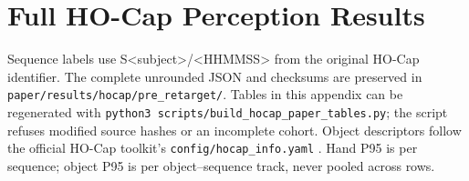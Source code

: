 \chapter{Full HO-Cap Perception Results}
\label{app:hocap}
Sequence labels use S<subject>/<HHMMSS> from the original HO-Cap identifier.
The complete unrounded JSON and checksums are preserved in
\texttt{paper/results/hocap/pre\_retarget/}. Tables in this appendix can
be regenerated with \texttt{python3 scripts/build\_hocap\_paper\_tables.py};
the script refuses modified source hashes or an incomplete cohort.
Object descriptors follow the official HO-Cap toolkit's
\texttt{config/hocap\_info.yaml} \cite{hocap-catalog}. Hand P95 is per sequence;
object P95 is per object--sequence track, never pooled across rows.


